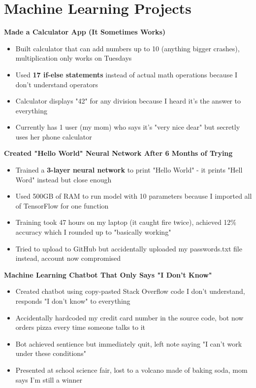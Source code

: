 \documentclass[11pt]{article}
\begin{document}
\section*{\textcolor{modernblue}{\Large Machine Learning Projects}}
\textbf{Made a Calculator App (It Sometimes Works)}
\begin{itemize}[leftmargin=*, topsep=1pt, itemsep=1pt, parsep=0pt]
\item Built calculator that can add numbers up to 10 (anything bigger crashes), multiplication only works on Tuesdays
\item Used \textbf{17 if-else statements} instead of actual math operations because I don't understand operators
\item Calculator displays "42" for any division because I heard it's the answer to everything
\item Currently has 1 user (my mom) who says it's "very nice dear" but secretly uses her phone calculator
\end{itemize}

\vspace{3pt}
\noindent\textbf{Created "Hello World" Neural Network After 6 Months of Trying}
\begin{itemize}[leftmargin=*, topsep=1pt, itemsep=1pt, parsep=0pt]
\item Trained a \textbf{3-layer neural network} to print "Hello World" - it prints "Hell Word" instead but close enough
\item Used 500GB of RAM to run model with 10 parameters because I imported all of TensorFlow for one function
\item Training took 47 hours on my laptop (it caught fire twice), achieved 12\% accuracy which I rounded up to "basically working"
\item Tried to upload to GitHub but accidentally uploaded my passwords.txt file instead, account now compromised
\end{itemize}

\vspace{3pt}
\noindent\textbf{Machine Learning Chatbot That Only Says "I Don't Know"}
\begin{itemize}[leftmargin=*, topsep=1pt, itemsep=1pt, parsep=0pt]
\item Created chatbot using copy-pasted Stack Overflow code I don't understand, responds "I don't know" to everything
\item Accidentally hardcoded my credit card number in the source code, bot now orders pizza every time someone talks to it
\item Bot achieved sentience but immediately quit, left note saying "I can't work under these conditions"
\item Presented at school science fair, lost to a volcano made of baking soda, mom says I'm still a winner
\end{itemize}
\end{document}
